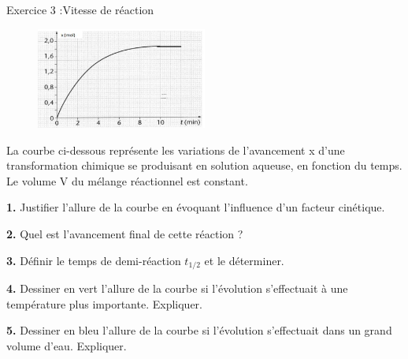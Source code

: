 \documentclass[12pt, french]{article}
\begin{document}
\begin{Box2}{Exercice 3 :Vitesse de réaction  }
\begin{figure}
  \begin{center}
	\includegraphics[width=0.5\textwidth]{./img/ex3.png}
  \end{center}
\end{figure}
La courbe ci-dessous représente les variations de l'avancement x d’une transformation chimique se produisant
en solution aqueuse, en fonction du temps. Le volume V du mélange réactionnel est constant.

\textbf{1. }Justifier l’allure de la courbe en évoquant
l’influence d’un facteur cinétique.

\textbf{2. }Quel est l’avancement final de cette
réaction ?

\textbf{3. }Définir le temps de demi-réaction $t_{1/2}$ et le
déterminer.

\textbf{4. }Dessiner en vert l’allure de la courbe si
l’évolution s’effectuait à une température plus importante. Expliquer.

\textbf{5. }Dessiner en bleu l’allure de la courbe si
l’évolution s’effectuait dans un grand
volume d’eau. Expliquer.
\end{Box2}
\end{document}
